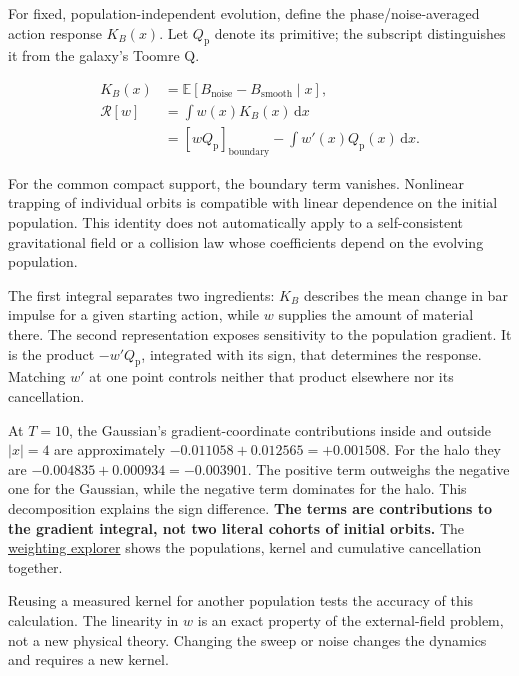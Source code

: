 \documentclass[fleqn,usenatbib]{mnras}
\begin{document}
For fixed, population-independent evolution, define the phase/noise-averaged action response \(K_B(x)\). Let \(Q_{\mathrm p}\) denote its primitive; the subscript distinguishes it from the galaxy's Toomre Q.

\begin{equation}\label{EQ-KER-01}
\begin{aligned}
K_B(x)&=\mathbb E[B_{\mathrm{noise}}-B_{\mathrm{smooth}}\mid x],\\
\mathcal R[w]&=\int w(x)K_B(x)\,\mathrm dx\\
&=[wQ_{\mathrm p}]_{\mathrm{boundary}}-\int w'(x)Q_{\mathrm p}(x)\,\mathrm dx.
\end{aligned}
\end{equation}

For the common compact support, the boundary term vanishes. Nonlinear trapping of individual orbits is compatible with linear dependence on the initial population. This identity does not automatically apply to a self-consistent gravitational field or a collision law whose coefficients depend on the evolving population.

The first integral separates two ingredients: \(K_B\) describes the mean change in bar impulse for a given starting action, while \(w\) supplies the amount of material there. The second representation exposes sensitivity to the population gradient. It is the product \(-w'Q_{\mathrm p}\), integrated with its sign, that determines the response. Matching \(w'\) at one point controls neither that product elsewhere nor its cancellation.

At \(T=10\), the Gaussian's gradient-coordinate contributions inside and outside \(|x|=4\) are approximately \(-0.011058+0.012565=+0.001508\). For the halo they are \(-0.004835+0.000934=-0.003901\). The positive term outweighs the negative one for the Gaussian, while the negative term dominates for the halo. This decomposition explains the sign difference. \textbf{The terms are contributions to the gradient integral, not two literal cohorts of initial orbits.} The \href{https://djova.ca/galaxy-bar/population-response.html\#population-explorer}{weighting explorer} shows the populations, kernel and cumulative cancellation together.

Reusing a measured kernel for another population tests the accuracy of this calculation. The linearity in \(w\) is an exact property of the external-field problem, not a new physical theory. Changing the sweep or noise changes the dynamics and requires a new kernel.
\end{document}
